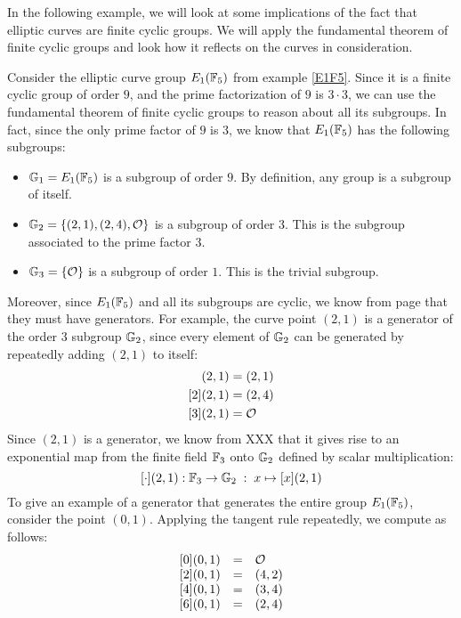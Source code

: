 In the following example, we will look at some implications of the fact that elliptic curves are finite cyclic groups. We will apply the fundamental theorem of finite cyclic groups and look how it reflects on the curves in consideration.
\begin{example}\label{ex:G1G2-subgroups}Consider the elliptic curve group $E_1(\F_5)$ from example \ref{E1F5}. Since it is a finite cyclic group of order $9$, and the prime factorization of $9$ is $3\cdot 3$, we can use the fundamental theorem of finite cyclic groups to reason about all its subgroups. In fact, since the only prime factor of $9$ is $3$, we know that $E_1(\F_5)$ has the following subgroups:
\begin{itemize}
\item $\G_1 = E_1(\F_5)$ is a subgroup of order $9$. By definition, any group is a subgroup of itself.
\item $\G_2 = \{(2,1),(2,4),\Oinf\}$ is a subgroup of order $3$. This is the subgroup associated to the prime factor $3$.
\item $\G_3 = \{\Oinf\}$ is a subgroup of order $1$. This is the trivial subgroup.
\end{itemize}
Moreover, since $E_1(\F_5)$ and all its subgroups are cyclic, we know from page \pageref{cyclic-groups} that they must have generators. For example, the curve point $(2,1)$ is a generator of the order $3$ subgroup $\G_2$, since every element of $\G_2$ can be generated by repeatedly adding $(2,1)$ to itself: 
\begin{align*}
[1](2,1) & = (2,1) \\
[2](2,1) & = (2,4) \\
[3](2,1) & = \Oinf
\end{align*}
Since $(2,1)$ is a generator, we know from XXX that it gives rise to an exponential map from the finite field $\F_3$ onto $\G_2$ defined by scalar multiplication:
$$
[\cdot](2,1): \F_3 \to \G_2\; : \; x\mapsto [x](2,1) 
$$
To give an example of a generator that generates the entire group $E_1(\F_5)$, consider the point $(0,1)$. Applying the tangent rule repeatedly, we compute as follows:
$$
\begin{array}{lccr}
{}\begin{array}{lcl}
{}[0](0,1) &=& \Oinf \\
{}[2](0,1) &=& (4, 2) \\ 
{}[4](0,1) &=& (3, 4) \\ 
{}[6](0,1) &=& (2, 4) \\ 

\end{array}
\end{array}$$
\end{example}
